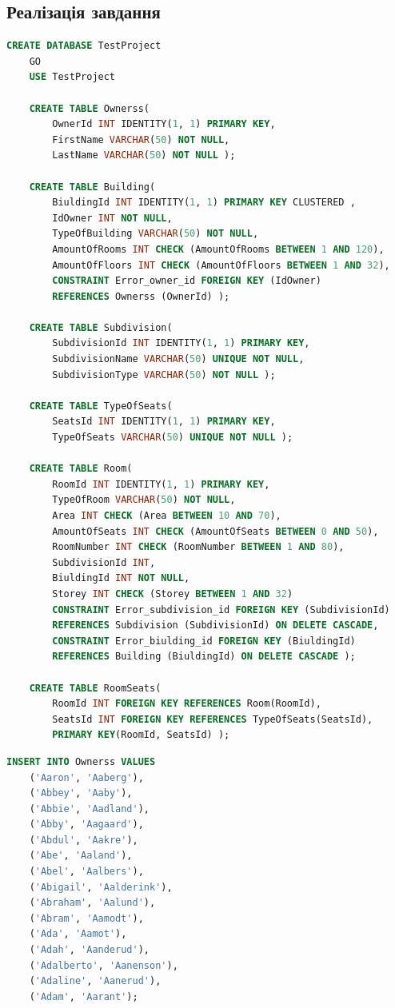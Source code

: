 \documentclass[a4paper,12pt]{article}
\begin{document}
\newpage
	\begin{center}
		\section*{\bfseries{Реалізація завдання}}
	\end{center}

	\begin{lstlisting}[language=SQL]
	CREATE DATABASE TestProject
	GO
	USE TestProject
	
	CREATE TABLE Ownerss(
		OwnerId INT IDENTITY(1, 1) PRIMARY KEY,
		FirstName VARCHAR(50) NOT NULL,
		LastName VARCHAR(50) NOT NULL );
	
	CREATE TABLE Building(
		BiuldingId INT IDENTITY(1, 1) PRIMARY KEY CLUSTERED ,
		IdOwner INT NOT NULL,
		TypeOfBuilding VARCHAR(50) NOT NULL,
		AmountOfRooms INT CHECK (AmountOfRooms BETWEEN 1 AND 120),
		AmountOfFloors INT CHECK (AmountOfFloors BETWEEN 1 AND 32),
		CONSTRAINT Error_owner_id FOREIGN KEY (IdOwner) 
		REFERENCES Ownerss (OwnerId) );
	
	CREATE TABLE Subdivision(
		SubdivisionId INT IDENTITY(1, 1) PRIMARY KEY,
		SubdivisionName VARCHAR(50) UNIQUE NOT NULL,
		SubdivisionType VARCHAR(50) NOT NULL );
	
	CREATE TABLE TypeOfSeats(
		SeatsId INT IDENTITY(1, 1) PRIMARY KEY,
		TypeOfSeats VARCHAR(50) UNIQUE NOT NULL ); 
	
	CREATE TABLE Room(
		RoomId INT IDENTITY(1, 1) PRIMARY KEY,
		TypeOfRoom VARCHAR(50) NOT NULL,
		Area INT CHECK (Area BETWEEN 10 AND 70), 
		AmountOfSeats INT CHECK (AmountOfSeats BETWEEN 0 AND 50), 
		RoomNumber INT CHECK (RoomNumber BETWEEN 1 AND 80), 
		SubdivisionId INT,
		BiuldingId INT NOT NULL,
		Storey INT CHECK (Storey BETWEEN 1 AND 32)
		CONSTRAINT Error_subdivision_id FOREIGN KEY (SubdivisionId) 
		REFERENCES Subdivision (SubdivisionId) ON DELETE CASCADE,
		CONSTRAINT Error_biulding_id FOREIGN KEY (BiuldingId) 
		REFERENCES Building (BiuldingId) ON DELETE CASCADE );
	
	CREATE TABLE RoomSeats(
		RoomId INT FOREIGN KEY REFERENCES Room(RoomId),
		SeatsId INT FOREIGN KEY REFERENCES TypeOfSeats(SeatsId),
		PRIMARY KEY(RoomId, SeatsId) );
	\end{lstlisting}

\newpage
	
	\begin{lstlisting}[language=SQL]
	INSERT INTO Ownerss VALUES
	('Aaron', 'Aaberg'),
	('Abbey', 'Aaby'),
	('Abbie', 'Aadland'),
	('Abby', 'Aagaard'),
	('Abdul', 'Aakre'),
	('Abe', 'Aaland'),
	('Abel', 'Aalbers'),
	('Abigail', 'Aalderink'),
	('Abraham', 'Aalund'),
	('Abram', 'Aamodt'),
	('Ada', 'Aamot'),
	('Adah', 'Aanderud'),
	('Adalberto', 'Aanenson'),
	('Adaline', 'Aanerud'),
	('Adam', 'Aarant');
	\end{lstlisting}
\end{document}
